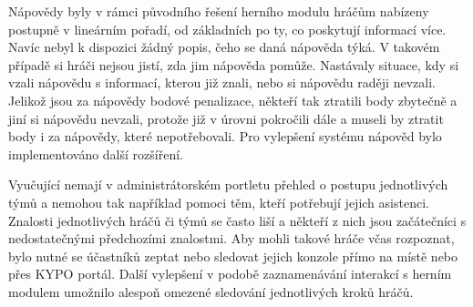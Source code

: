 \documentclass[
  digital, %
  oneside, %
  table,   %
  nolof,     %
  nolot,     %
]{fithesis3}
\begin{document}
Nápovědy byly v rámci původního řešení herního modulu hráčům nabízeny postupně v lineárním pořadí, od základních po ty, co poskytují informací více. Navíc nebyl k dispozici žádný popis, čeho se daná nápověda týká. V takovém případě si hráči nejsou jistí, zda jim nápověda pomůže. Nastávaly situace, kdy si vzali nápovědu s informací, kterou již znali, nebo si nápovědu raději nevzali. Jelikož jsou za nápovědy bodové penalizace, někteří tak ztratili body zbytečně a jiní si nápovědu nevzali, protože již v úrovni pokročili dále a museli by ztratit body i za nápovědy, které nepotřebovali. Pro vylepšení systému nápověd bylo implementováno další rozšíření.\par
Vyučující nemají v administrátorském portletu přehled o postupu jednotlivých týmů a nemohou tak například pomoci těm, kteří potřebují jejich asistenci. Znalosti jednotlivých hráčů či týmů se často liší a někteří z nich jsou začátečníci s nedostatečnými předchozími znalostmi. Aby mohli takové hráče včas rozpoznat, bylo nutné se účastníků zeptat nebo sledovat jejich konzole přímo na místě nebo přes KYPO portál. Další vylepšení v podobě zaznamenávání interakcí s herním modulem umožnilo alespoň omezené sledování jednotlivých kroků hráčů. \cite{ctfDesign}
\end{document}
